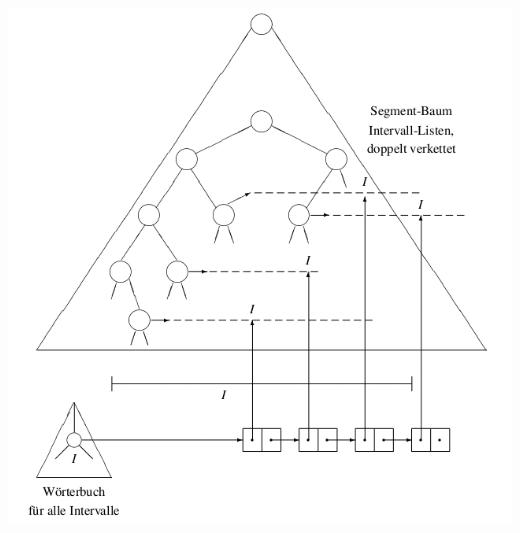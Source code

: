 \documentclass[a4paper]{book}
\begin{document}
\begin{center}
\includegraphics[scale=0.6]{Figures/segtreew.png}
\end{center}
\end{document}
